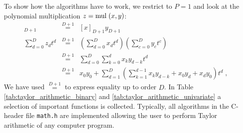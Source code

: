 \documentclass[a4paper,12pt,twoside]{article}
\begin{document}
To show how the algorithms have to work, we restrict to $P=1$ and look at the polynomial multiplication $z = \mathrm{mul}\;(x,y)$:
\begin{eqnarray}
[z]_{D+1} &\stackrel{D+1}{=}& [x]_{D+1} y_{D+1} \\
\sum_{d=0}^D z_d t^d &\stackrel{D+1}{=}& \left( \sum_{d=0}^D x_d t^d \right) \left( \sum_{c=0}^D y_c t^c \right)   \\
&\stackrel{D+1}{=}& \sum_{d=0}^D \sum_{k=0}^d x_k y_{d-k} t^d \\
&\stackrel{D+1}{=}& x_0 y_0 + \sum_{d=1}^D \left( \sum_{k=1}^{d-1} x_k y_{d-k} + x_0 y_d + x_d y_0 \right)  t^d \;,
\end{eqnarray}
We have used $\stackrel{D+1}{=}$ to express equality up to order $D$. In Table \ref{tab:taylor_arithmetic_binary} and \ref{tab:taylor_arithmetic_univariate} a selection of important functions is collected. Typically, all algorithms in the C-header file \texttt{math.h} are implemented allowing the user to perform Taylor arithmetic of any computer program.
\end{document}
